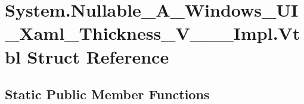 \hypertarget{struct_system_1_1_nullable___a___windows___u_i___xaml___thickness___v_______impl_1_1_vtbl}{}\section{System.\+Nullable\+\_\+\+A\+\_\+\+Windows\+\_\+\+U\+I\+\_\+\+Xaml\+\_\+\+Thickness\+\_\+\+V\+\_\+\+\_\+\+\_\+\+Impl.\+Vtbl Struct Reference}
\label{struct_system_1_1_nullable___a___windows___u_i___xaml___thickness___v_______impl_1_1_vtbl}
\subsection*{Static Public Member Functions}
